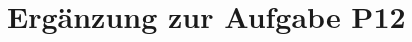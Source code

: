 
\setcounter{H-section}{17}
\renewcommand*\thesection{H\Nummerierung{\arabic{H-section}}}
\section{Ergänzung zur Aufgabe P12}